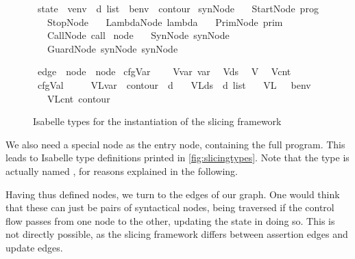 \documentclass[a4paper,parskip=half,BCOR=8mm,DIV=calc,12pt]{scrbook}
\begin{document}
\begin{figure}
\begin{framed}
\begin{minipage}[t]{.6\linewidth}
\begin{isabellebody}
\isamarkupfalse%
\ state\ {\isacharequal}\ {\isachardoublequoteopen}venv\ {\isasymtimes}\ d\ list\ {\isasymtimes}\ benv\ {\isasymtimes}\ contour{\isachardoublequoteclose}\isanewline
\isanewline
{}\isamarkupfalse%
\ synNode\isanewline
\ \ {\isacharequal}\ StartNode\ prog\isanewline
\ \ {\isacharbar}\ StopNode\isanewline
\ \ {\isacharbar}\ LambdaNode\ lambda\isanewline
\ \ {\isacharbar}\ PrimNode\ prim\isanewline
\ \ {\isacharbar}\ CallNode\ call\isanewline
\isanewline
{}\isamarkupfalse%
\ node\isanewline
\ \ {\isacharequal}\ SynNode\ synNode\isanewline
\ \ {\isacharbar}\ GuardNode\ synNode\ synNode
\end{isabellebody}
\end{minipage}\hfill
\begin{minipage}[t]{.4\linewidth}
\begin{isabellebody}
\isamarkupfalse%
\ edge\ {\isacharequal}\ {\isachardoublequoteopen}node\ {\isasymtimes}\ node{\isachardoublequoteclose}\isanewline
\isanewline
{}\isamarkupfalse%
\ cfgVar\ {\isacharequal}\isanewline
\ \ \ Vvar\ var\isanewline
\ {\isacharbar}\ Vds\isanewline
\ {\isacharbar}\ V{\isasymbeta}\isanewline
\ {\isacharbar}\ Vcnt\isanewline
\isanewline
{}\isamarkupfalse%
\ cfgVal\ {\isacharequal}\ \isanewline
\ \ \ VLvar\ \ {\isachardoublequoteopen}contour\ {\isasymrightharpoonup}\ d{\isachardoublequoteclose}\isanewline
\ \ {\isacharbar}\ VLds\ \ {\isachardoublequoteopen}d\ list{\isachardoublequoteclose}\isanewline
\ \ {\isacharbar}\ VL{\isasymbeta}\ \ \ benv\isanewline
\ \ {\isacharbar}\ VLcnt\ contour
\end{isabellebody}
\end{minipage}
\end{framed}
\caption{Isabelle types for the instantiation of the slicing framework}
\label{fig:slicingtypes}
\end{figure}

We also need a special node as the entry node, containing the full program. This leads to Isabelle type definitions printed in \vref{fig:slicingtypes}. Note that the type is actually named , for reasons explained in the following.

Having thus defined nodes, we turn to the edges of our graph. One would think that these can just be pairs of syntactical nodes, being traversed if the control flow passes from one node to the other, updating the state in doing so. This is not directly possible, as the slicing framework differs between assertion edges and update edges.
\end{document}
